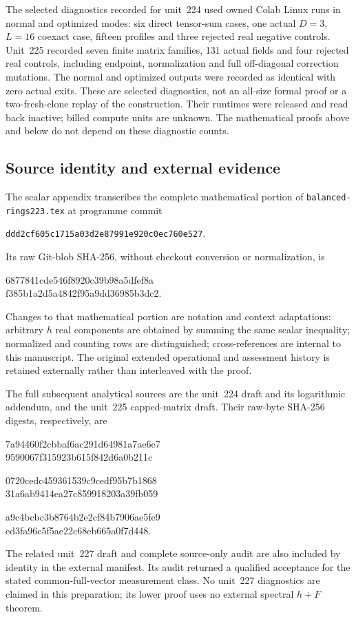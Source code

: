 The selected diagnostics recorded for unit~224 used owned Colab Linux runs
in normal and optimized modes: six direct tensor-sum cases, one actual
$D=3$, $L=16$ coexact case, fifteen profiles and three rejected real negative
controls. Unit~225 recorded seven finite matrix families, 131 actual fields
and four rejected real controls, including endpoint, normalization and
full off-diagonal correction mutations. The normal and optimized outputs
were recorded as identical with zero actual exits. These are selected
diagnostics, not an all-size formal proof or a two-fresh-clone replay of
the construction. Their runtimes were released and read back inactive;
billed compute units are unknown. The mathematical proofs above and below
do not depend on these diagnostic counts.

\subsection*{Source identity and external evidence}
The scalar appendix transcribes the complete mathematical portion of
\texttt{balanced-rings223.tex} at programme commit
\begin{center}\small\texttt{ddd2cf605c1715a03d2e87991e920c0ec760e527}.\end{center}
Its raw Git-blob SHA-256, without checkout conversion or normalization, is
\begin{center}\small\ttfamily
6877841cde546f8920c39b98a5dfef8a\\
f385b1a2d5a4842f95a9dd36985b3dc2.
\end{center}
Changes to that mathematical portion are notation and context adaptations:
arbitrary $h$ real components are obtained by summing the same scalar
inequality; normalized and counting rows are distinguished; cross-references
are internal to this manuscript. The original extended operational and
assessment history is retained externally rather than interleaved with the
proof.

The full subsequent analytical sources are the unit~224 draft and its
logarithmic addendum, and the unit~225 capped-matrix draft. Their raw-byte
SHA-256 digests, respectively, are
\begin{center}\small\ttfamily
7a94460f2cbbaf6ac291d64981a7ae6e7\\
9590067f315923b615f842d6a0b211c\par\medskip
0720cedc459361539c9cedf95b7b1868\\
31a6ab9414ea27c859918203a39fb059\par\medskip
a9c4bcbc3b8764b2e2cf84b7906ae5fe9\\
ed3fa96c5f5ae22c68eb665a0f7d448.
\end{center}
The related unit~227 draft and complete source-only audit are also included
by identity in the external manifest. Its audit returned a qualified acceptance
for the stated common-full-vector measurement class. No unit~227 diagnostics
are claimed in this preparation; its lower proof uses no external spectral
$h+F$ theorem.

